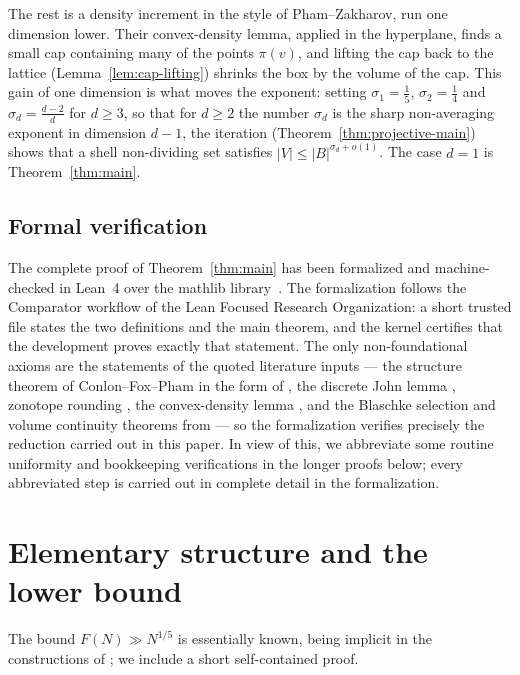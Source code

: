 \documentclass[11pt,reqno]{amsart}
\theoremstyle{definition}
\theoremstyle{remark}
\begin{document}
The rest is a density increment in the style of Pham--Zakharov, run one
dimension lower.  Their convex-density lemma, applied in the hyperplane,
finds a small cap containing many of the points $\pi(v)$, and lifting
the cap back to the lattice (Lemma~\ref{lem:cap-lifting}) shrinks the
box by the volume of the cap.  This gain of one dimension is what moves
the exponent: setting $\sigma_1=\frac15$, $\sigma_2=\frac14$ and
$\sigma_d=\frac{d-2}d$ for $d\ge3$, so that for $d\ge2$ the number
$\sigma_d$ is the sharp non-averaging exponent in dimension $d-1$, the
iteration (Theorem~\ref{thm:projective-main}) shows that a shell
non-dividing set satisfies $|V|\le|B|^{\sigma_d+o(1)}$.  The case $d=1$
is Theorem~\ref{thm:main}.

\subsection{Formal verification}
\label{sec:formalization}

The complete proof of Theorem~\ref{thm:main} has been formalized and
machine-checked in Lean~4 over the mathlib
library~\cite{Formalization}.  The formalization follows the Comparator
workflow of the Lean Focused Research Organization: a short trusted file
states the two definitions and the main theorem, and the kernel certifies
that the development proves exactly that statement.  The only
non-foundational axioms are the statements of the quoted literature
inputs --- the structure theorem of Conlon--Fox--Pham in the form of
\cite[Corollary~5]{PhamZakharov}, the discrete John lemma
\cite[Lemma~7]{PhamZakharov}, zonotope rounding
\cite[Lemma~13]{PhamZakharov}, the convex-density lemma
\cite[Lemma~1]{PhamZakharov}, and the Blaschke selection and volume
continuity theorems from \cite{Schneider} --- so the formalization
verifies precisely the reduction carried out in this paper.  In view of
this, we abbreviate some routine uniformity and bookkeeping verifications
in the longer proofs below; every abbreviated step is carried out in
complete detail in the formalization.

\section{Elementary structure and the lower bound}
\label{sec:elementary}

The bound $F(N)\gg N^{1/5}$ is essentially known, being implicit in the
constructions of \cite{Er97,ELRSS99}; we include a short self-contained
proof.
\end{document}
